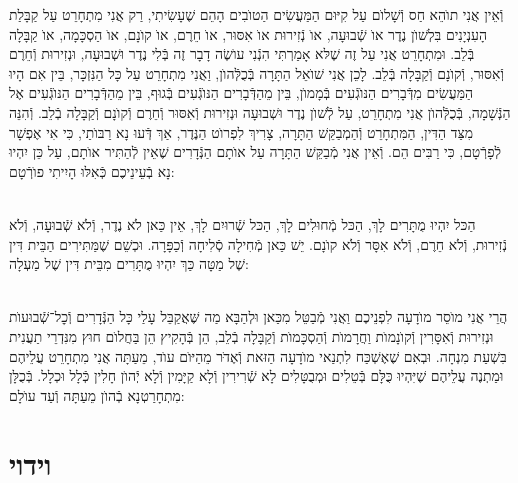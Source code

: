 \documentclass[twoside, openany, parskip=half, 11pt]{book}
\begin{document}
\begin{sometimes}
וְֿאֵין אֲנִי תוׂהֵא חַס וְֿשָׁלוׂם עַל קִיּוּם הַמַּעֲשִׂים הַטוׂבִים הָהֵם שֶׁעָשִׂיתִי, רַק אֲנִי מִתְחָרֵט עַל קַבָּלַת הָעִנְיָנִים בִּלְשׁוׂן נֶדֶר אוׂ שְֿׁבוּעָה, אוׂ נְֿזִירוּת אוׂ אִסּוּר, אוׂ חֵרֶם, אוׂ קוׂנָם, אוׂ הַסְכָּמָה, אוׂ קַבָּלָה בְּֿלֵב. וּמִתְחָרֵט אֲנִי עַל זֶה שֶׁלּא אָמַרְתִּי הִנְֿנִי עוׂשֶׂה דָבָר זֶה בְּֿלִי נֶדֶר וּשְׁבוּעָה, וּנְזִירוּת וְֿחֵרֶם וְֿאִסּוּר, וְֿקוׂנָם וְֿקַבָּלָה בְּֿלֵב. לָכֵן אֲנִי שׁוׂאֵל הַתָּרָה בְּֿכֻלְּֿהוׂן, וַאֲנִי מִתְחָרֵט עַל כָּל הַנִּזְכָּר, בֵּין אִם הָיוּ הַמַּעֲשִׂים מִדְּֿבָרִים הַנּוׂגְֿעִים בְּֿמָמוׂן, בֵּין מֵהַדְּֿבָרִים הַנּוׂגְֿעִים בְּֿגוּף, בֵּין מֵהַדְּֿבָרִים הַנּוׂגְֿעִים אֶל הַנְּֿשָׁמָה, בְּֿכֻלְּֿהוׂן אֲנִי מִתְחָרֵט, עַל לְֿשׁוׂן נֶדֶר וּשְׁבוּעָה וּנְזִירוּת וְֿאִסּוּר וְֿחֵרֶם וְֿקוׂנָם וְֿקַבָּלָה בְֿלֵב. וְֿהִנֵּה מִצַּד הַדִּין, הַמִּתְחָרֵט וְֿהַמְבַקֵּשׁ הַתָּרָה, צָרִיךְ לִפְרוׂט הַנֶּדֶר, אַךְ דְּֿעוּ נָא רַבּוׂתַי, כִּי אִי אֶפְשָׁר לְֿפָרְֿטָם, כִּי רַבִּים הֵם. וְֿאֵין אֲנִי מְֿבַקֵּשׁ הַתָּרָה עַל אוׂתָם הַנְּֿדָרִים שֶׁאֵין לְֿהַתִּיר אוׂתָם, עַל כֵּן יִהְיוּ נָא בְֿעֵינֵיכֶם כְּֿאִלּוּ הָיִיתִי פוׂרְֿטָם:

\\
הַכּל יִהְיוּ מֻתָּרִים לָךְ, הַכּל מְֿחוּלִים לָךְ, הַכּל שְֿׁרוּיִם לָךְ, אֵין כַּאן לֺא נֶדֶר, וְֿלֺא שְֿׁבוּעָה, וְֿלֺא נְֿזִירוּת, וְֿלֺא חֵרֶם, וְֿלֺא אִסָּר וְֿלֺא קוׂנָם. יֵשׁ כַּאן מְֿחִילָה סְֿלִיחָה וְֿכַפָּרָה. וּכְשֵׁם שֶׁמַּתִּירִים הַבֵּית דִּין שֶׁל מַטָּה כַּךְ יִהְיוּ מֻתָּרִים מִבֵּית דִּין שֶׁל מַעְלָה:

\\
הֲרֵי אֲנִי מוֺסֵר מוׂדָעָה לִפְנֵיכֶם וַאֲנִי מְֿבַטֵּל מִכַּאן וּלְהַבָּא מַה שֶּׁאֲקַבֵּל עָלַי כָּל הַנְּֿדָרִים וְֿכׇל־שְֿׁבוּעוׂת וּנְזִירוּת וְֿאִסָּרִין וְֿקוׂנָמוׂת וַחֲרָמוׂת וְֿהַסְכָּמוׂת וְֿקַבָּלָה בְֿלֵב, הֵן בְּֿהָקִיץ הֵן בַּחֲלוׂם חוּץ מִנִּדְרֵי תַעֲנִית בִּשְׁעַת מִנְחָה. וּבְאִם שֶׁאֶשְׁכַּח לִתְנַאי מוׂדָעָה הַזּאת וְֿאֶדּׂר מֵהַיּוׂם עוׂד, מֵעַתָּה אֲנִי מִתְחָרֵט עֲלֵיהֶם וּמַתְנֶה עֲלֵיהֶם שֶׁיִּהְיוּ כֻּלָּם בְּֿטֵלִים וּמְבֻטָּלִים לָא שְֿׁרִירִין וְֿלָא קַיָּמִין וְֿלָא יְֿהוׂן חָלִין כְּֿלָל וּכְלָל. בְּֿכֻלָּן מִתְחָרַטְנָא בְֿהוׂן מֵעַתָּה וְֿעַד עוׂלָם:

\vfill
\sepline




\chapter[וידוי]{ וידוי }


\end{sometimes}
\end{document}
